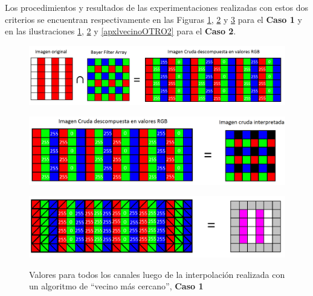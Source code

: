 \documentclass[a4paper]{article}
\begin{document}
Los procedimientos y resultados de las experimentaciones realizadas con estos dos criterios se encuentran respectivamente en las Figuras \ref{apxlvecino0}, \ref{apxlvecino1} y \ref{apxlvecino2} para el \textbf{Caso 1} y en las ilustraciones \ref{apxlvecino0}, \ref{apxlvecino1} y \ref{apxlvecinoOTRO2} para el \textbf{Caso 2}.

\begin{figure}[h!]
    \caption{}
    \begin{center}
    \includegraphics[scale=0.35]{imagenes/apxlvecino0}
    \label{apxlvecino0}
  \end{center}
\end{figure}

\begin{figure}[h!]
    \caption{}
    \begin{center}
    \includegraphics[scale=0.45]{imagenes/apxlvecino1}
    \label{apxlvecino1}
  \end{center}
\end{figure}


\begin{figure}[h!]
    \caption{Valores para todos los canales luego de la interpolación realizada con un algoritmo de ``vecino más cercano'', \textbf{Caso 1}}
    \begin{center}
    \includegraphics[scale=0.45]{imagenes/apxlvecino2}
    \label{apxlvecino2}
  \end{center}
\end{figure}
\end{document}
